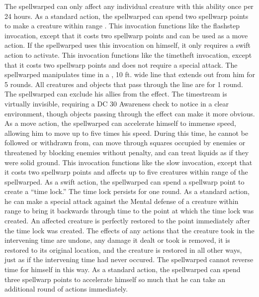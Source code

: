 The spellwarped can only affect any individual creature with this ability once per 24 hours.
As a standard action, the spellwarped can spend two spellwarp points to make a creature within \rngmed range \slowed.
This invocation functions like the flashstep invocation, except that it costs two spellwarp points and can be used as a move action.
If the spellwarped uses this invocation on himself, it only requires a swift action to activate.
This invocation functions like the timetheft invocation, except that it costs two spellwarp points and does not require a special attack.
The spellwarped manipulates time in a \arealarge, 10 ft.
wide line that extends out from him for 5 rounds.
All creatures and objects that pass through the line are \slowed for 1 round.
The spellwarped can exclude his allies from the effect.
The timestream is virtually invisible, requiring a DC 30 Awareness check to notice in a clear environment, though objects passing through the effect can make it more obvious.
As a move action, the spellwarped can accelerate himself to immense speed, allowing him to move up to five times his speed.
During this time, he cannot be followed or withdrawn from, can move through squares occupied by enemies or threatened by blocking enemies without penalty, and can treat liquids as if they were solid ground.
This invocation functions like the slow invocation, except that it costs two spellwarp points and affects up to five creatures within \rngclose range of the spellwarped.
As a swift action, the spellwarped can spend a spellwarp point to create a ``time lock.'' The time lock persists for one round.
As a standard action, he can make a special attack against the Mental defense of a creature within \rngmed range to bring it backwards through time to the point at which the time lock was created.
An affected creature is perfectly restored to the point immediately after the time lock was created.
The effects of any actions that the creature took in the intervening time are undone, any damage it dealt or took is removed, it is restored to its original location, and the creature is restored in all other ways, just as if the intervening time had never occured.
The spellwarped cannot reverse time for himself in this way.
As a standard action, the spellwarped can spend three spellwarp points to accelerate himself so much that he can take an additional round of actions immediately.
